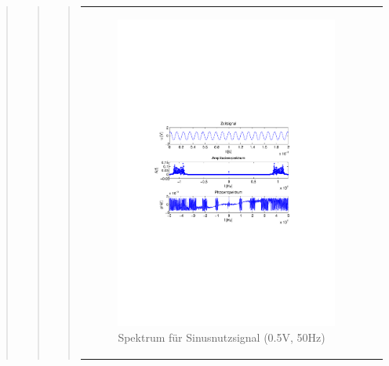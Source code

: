 \begin{quote}
\begin{quote}
\begin{quote}
\begin{center}
\begin{tabular}{ll}
\begin{minipage}{0.6\textwidth}
                    \begin{figure}[H]
                        \label{fig:}
                        \includegraphics[scale=0.5, trim = 4cm 9.5cm 3.5cm
                        9.5cm, clip]{./Bilder/sin_a05_f50}
                        \caption{Spektrum für Sinusnutzsignal (0.5V, 50Hz)}
                    \end{figure}

                \end{minipage}
                \begin{minipage}{0.6\textwidth}


\end{minipage}
\end{tabular}
\end{center}
\end{quote}
\end{quote}
\end{quote}

